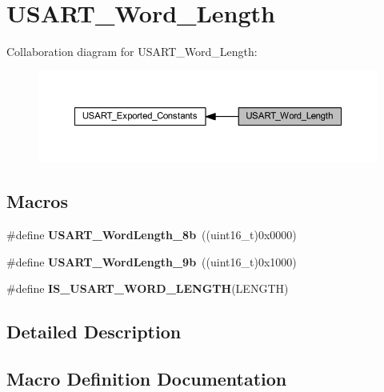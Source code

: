 \hypertarget{group___u_s_a_r_t___word___length}{}\section{U\+S\+A\+R\+T\+\_\+\+Word\+\_\+\+Length}
\label{group___u_s_a_r_t___word___length}
Collaboration diagram for U\+S\+A\+R\+T\+\_\+\+Word\+\_\+\+Length\+:\nopagebreak
\begin{figure}[H]
\begin{center}
\leavevmode
\includegraphics[width=350pt]{group___u_s_a_r_t___word___length}
\end{center}
\end{figure}
\subsection*{Macros}
\begin{DoxyCompactItemize}
\item 
\mbox{\label{group___u_s_a_r_t___word___length_ga08682faddc657df85a93627b5a146c25}} 
\#define {\bfseries U\+S\+A\+R\+T\+\_\+\+Word\+Length\+\_\+8b}~((uint16\+\_\+t)0x0000)
\item 
\mbox{\label{group___u_s_a_r_t___word___length_gae7dd162142660e09e2321aa3f33dc4d2}} 
\#define {\bfseries U\+S\+A\+R\+T\+\_\+\+Word\+Length\+\_\+9b}~((uint16\+\_\+t)0x1000)
\item 
\#define {\bfseries I\+S\+\_\+\+U\+S\+A\+R\+T\+\_\+\+W\+O\+R\+D\+\_\+\+L\+E\+N\+G\+TH}(L\+E\+N\+G\+TH)
\end{DoxyCompactItemize}


\subsection{Detailed Description}


\subsection{Macro Definition Documentation}
\mbox{\label{group___u_s_a_r_t___word___length_ga5b07b29ee91f0bea4c10ec0fd74fbc04}} 
